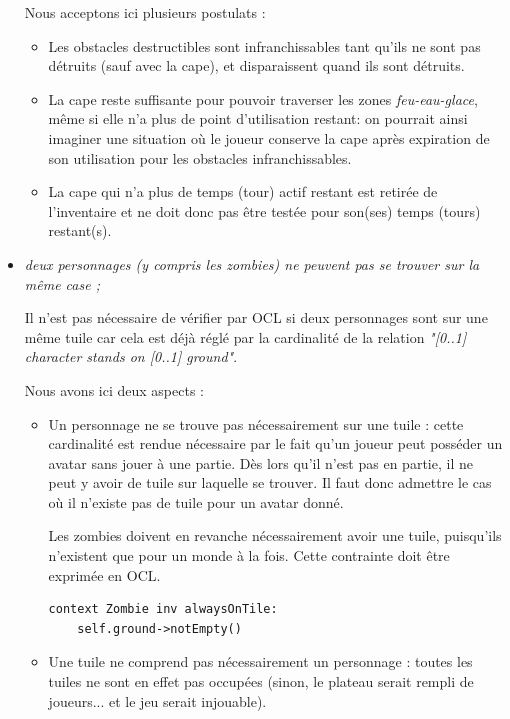 \documentclass[oneside,a4paper]{book}
\begin{document}
\begin{itemize}
\begin{tcolorbox}
    Nous acceptons ici plusieurs postulats :
    \begin{itemize}
        \item Les obstacles destructibles sont infranchissables tant qu'ils ne sont pas détruits (sauf avec la cape), et disparaissent quand ils sont détruits.
        \item La cape reste suffisante pour pouvoir traverser les zones \textit{feu-eau-glace}, même si elle n'a plus de point d'utilisation restant: on pourrait ainsi imaginer une situation où le joueur conserve la cape après expiration de son utilisation pour les obstacles infranchissables.
        \item La cape qui n'a plus de temps (tour) actif restant est retirée de l'inventaire et ne doit donc pas être testée pour son(ses) temps (tours) restant(s).
    \end{itemize}
\end{tcolorbox}
    
    \item \textit{deux personnages (y compris les zombies) ne peuvent pas se trouver sur la même case ;}
    
    
    Il n'est pas nécessaire de vérifier par OCL si deux personnages sont sur une même tuile car cela est déjà réglé par la cardinalité de la relation \textit{"{[}0..1{]} character stands on {[}0..1{]} ground"}.
    
    Nous avons ici deux aspects :
    \begin{itemize}
        \item Un personnage ne se trouve pas nécessairement sur une tuile : cette cardinalité est rendue nécessaire par le fait qu'un joueur peut posséder un avatar sans jouer à une partie. Dès lors qu'il n'est pas en partie, il ne peut y avoir de tuile sur laquelle se trouver. Il faut donc admettre le cas où il n'existe pas de tuile pour un avatar donné.
        
        Les zombies doivent en revanche nécessairement avoir une tuile, puisqu'ils n'existent que pour un monde à la fois. Cette contrainte doit être exprimée en OCL.
        \begin{lstlisting}
context Zombie inv alwaysOnTile:
    self.ground->notEmpty()
        \end{lstlisting}
        \item Une tuile ne comprend pas nécessairement un personnage : toutes les tuiles ne sont en effet pas occupées (sinon, le plateau serait rempli de joueurs... et le jeu serait injouable).
    \end{itemize}
    
\end{itemize}
\end{document}
